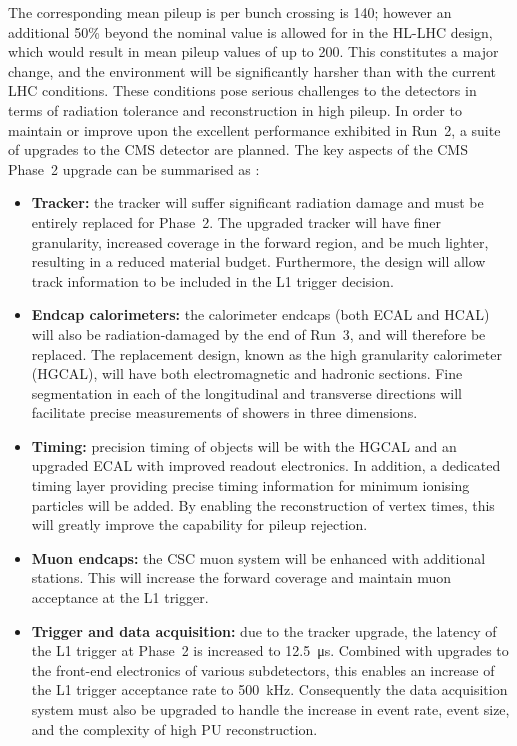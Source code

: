 The corresponding mean pileup is per bunch crossing is 140; however an additional 50\% beyond the nominal value is allowed for in the HL-LHC design, 
which would result in mean pileup values of up to 200.
This constitutes a major change, and the environment will be significantly harsher than with the current LHC conditions.
These conditions pose serious challenges to the detectors in terms of radiation tolerance and reconstruction in high pileup.
In order to maintain or improve upon the excellent performance exhibited in Run~2, a suite of upgrades to the CMS detector are planned.
The key aspects of the CMS Phase~2 upgrade can be summarised as \cite{UpgradeTP,MTD}:
\begin{itemize}
  \item{\textbf{Tracker:}
  the tracker will suffer significant radiation damage and must be entirely replaced for Phase~2.
  The upgraded tracker will have finer granularity, %
  increased coverage in the forward region, %
  and be much lighter, resulting in a reduced material budget.
  Furthermore, the design will allow track information to be included in the L1 trigger decision.}
  \item{\textbf{Endcap calorimeters:}
  the calorimeter endcaps (both ECAL and HCAL) will also be radiation-damaged by the end of Run~3, and will therefore be replaced.
  The replacement design, known as the high granularity calorimeter (HGCAL), will have both electromagnetic and hadronic sections.
  Fine segmentation in each of the longitudinal and transverse directions will facilitate precise measurements of showers in three dimensions.}
  \item{\textbf{Timing:}
  precision timing of objects will be with the HGCAL and an upgraded ECAL with improved readout electronics.
  In addition, a dedicated timing layer providing precise timing information for minimum ionising particles will be added.
  By enabling the reconstruction of vertex times, this will greatly improve the capability for pileup rejection.}
  \item{\textbf{Muon endcaps:}
  the CSC muon system will be enhanced with additional stations.
  This will increase the forward coverage and maintain muon acceptance at the L1 trigger.}
  \item{\textbf{Trigger and data acquisition:}
  due to the tracker upgrade, the latency of the L1 trigger at Phase~2 is increased to \SI{12.5}{\micro\second}.
  Combined with upgrades to the front-end electronics of various subdetectors, %
  this enables an increase of the L1 trigger acceptance rate to \SI{500}{\kilo\hertz}.
  Consequently the data acquisition system must also be upgraded to handle the increase in event rate, event size, and the complexity of high PU reconstruction.}
\end{itemize}
